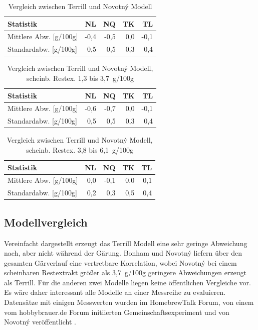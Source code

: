 \documentclass[a4paper,parskip=half]{scrartcl}
\begin{document}
\begin{table}[h]
\centering
\begin{tabular}{lrrrr}
\toprule
Statistik & NL & NQ & TK & TL \\
\midrule
Mittlere Abw. [g/100g] & -0,4 & -0,5 & 0,0 & -0,1 \\
Standardabw. [g/100g] & 0,5 & 0,5 & 0,3 & 0,4 \\
\bottomrule
\end{tabular}
\caption{Vergleich zwischen Terrill und Novotný Modell}
\label{table:terrillnovotnycomp}
\end{table}

\begin{table}[h]
\centering
\begin{tabular}{lrrrr}
\toprule
Statistik & NL & NQ & TK & TL \\
\midrule
Mittlere Abw. [g/100g] & -0,6 & -0,7 & 0,0 & -0,1 \\
Standardabw. [g/100g] & 0,5 & 0,5 & 0,3 & 0,4 \\
\bottomrule
\end{tabular}
\caption{Vergleich zwischen Terrill und Novotný Modell, scheinb. Restex. 1,3 bis 3,7~g/100g}
\label{table:terrillnovotnycomplg}
\end{table}

\begin{table}[h]
\centering
\begin{tabular}{lrrrr}
\toprule
Statistik & NL & NQ & TK & TL \\
\midrule
Mittlere Abw. [g/100g] & 0,0 & -0,1 & 0,0 & 0,1 \\
Standardabw. [g/100g] & 0,2 & 0,3 & 0,5 & 0,4 \\
\bottomrule
\end{tabular}
\caption{Vergleich zwischen Terrill und Novotný Modell, scheinb. Restex. 3,8 bis 6,1~g/100g}
\label{table:terrillnovotnycomphg}
\end{table}

\subsection*{Modellvergleich}

Vereinfacht dargestellt erzeugt das Terrill Modell eine sehr geringe
Abweichung nach, aber nicht während der Gärung. Bonham und Novotný
liefern über den gesamten Gärverlauf eine vertretbare Korrelation,
wobei Novotný bei einem scheinbaren Restextrakt größer als 3,7~g/100g
geringere Abweichungen erzeugt als Terrill. Für die anderen zwei Modelle
liegen keine öffentlichen Vergleiche vor. Es wäre daher interessant
alle Modelle an einer Messreihe zu evaluieren. Datensätze mit einigen
Messwerten wurden im HomebrewTalk Forum, von einem vom hobbybrauer.de Forum
initiierten Gemeinschaftsexperiment und von Novotný veröffentlicht
\autocite{Novotny2017a,Katman2019,Wolf2015}.
\end{document}

